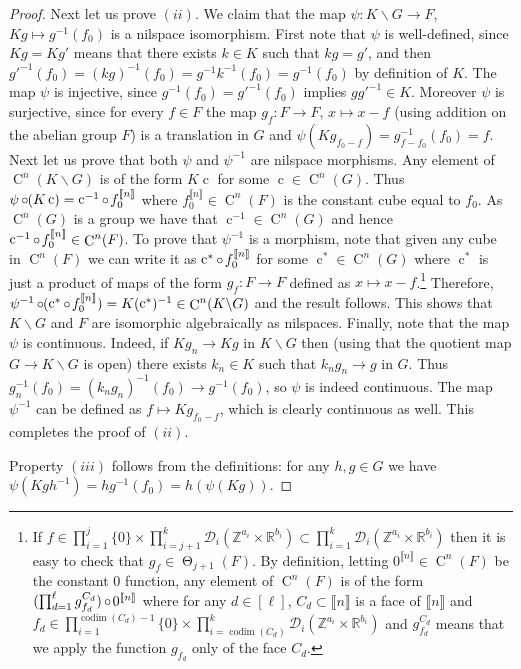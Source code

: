 \documentclass[a4paper,12pt,reqno]{amsart}
\theoremstyle{definition}
\def\to{\rightarrow}
\newcommand*{\db}[1]{\llbracket #1\rrbracket}
\newcommand{\mc}{\mathcal}
\newcommand{\mb}{\mathbb}
\DeclareMathOperator{\tran}{\Theta}
\DeclareMathOperator{\codim}{codim}
\DeclareMathOperator{\q}{c}
\DeclareMathOperator{\co}{\circ\hspace{-0.02 cm}}
\DeclareMathOperator{\cu}{C}
\begin{document}
\begin{proof}
Next let us prove $(ii)$.  We claim that the map $\psi:K\backslash G\to F$, $Kg \mapsto g^{-1}(f_0)$ is a nilspace isomorphism. First note that $\psi$ is well-defined, since $Kg=Kg'$ means that there exists $k\in K$ such that $kg=g'$, and then ${g'}^{-1}(f_0)=(kg)^{-1}(f_0)=g^{-1}k^{-1}(f_0)=g^{-1}(f_0)$ by definition of $K$. The map $\psi$ is injective, since $g^{-1}(f_0)={g'}^{-1}(f_0)$ implies $g{g'}^{-1}\in K$. Moreover $\psi$ is surjective, since for every $f\in F$ the map $g_f:F\to F$, $x\mapsto x-f$ (using addition on the abelian group $F$) is a translation in $G$ and $\psi(Kg_{f_0-f})=g^{-1}_{f-f_0}(f_0)=f$. Next let us prove that both $\psi$ and $\psi^{-1}$ are nilspace morphisms. Any element of $\cu^n(K\backslash G)$ is of the form $K\q$ for some $\q\in \cu^n(G)$. Thus $\psi\co (K\q) = \q^{-1} \co f_0^{\db{n}}$ where $f_0^{\db{n}}\in \cu^n(F)$ is the constant cube equal to $f_0$. As $\cu^n(G)$ is a group we have that $\q^{-1}\in \cu^n(G)$ and hence $\q^{-1}\co f_0^{\db{n}}\in\cu^n(F)$. To prove that $\psi^{-1}$ is a morphism, note that given any cube in $\cu^n(F)$ we can write it as $\q^*\co f_0^{\db{n}}$ for some $\q^*\in \cu^n(G)$ where $\q^*$ is just a product of maps of the form $g_f:F\to F$ defined as $x\mapsto x-f$.\footnote{ If $f\in \prod_{i=1}^j\{0\}\times \prod_{i=j+1}^k \mc{D}_i(\mb{Z}^{a_i}\times \mb{R}^{b_i})\subset \prod_{i=1}^k \mc{D}_i(\mb{Z}^{a_i}\times \mb{R}^{b_i})$ then it is easy to check that $g_f\in \tran_{j+1}(F)$. By definition, letting $0^{\db{n}}\in \cu^n(F)$ be the constant 0 function, any element of $\cu^n(F)$ is of the form $(\prod_{d=1}^\ell g_{f_d}^{C_d} )\co 0^{\db{n}}$ where for any $d\in[\ell]$, $C_d\subset \db{n}$ is a face of $\db{n}$ and $f_d\in \prod_{i=1}^{\codim(C_d)-1}\{0\}\times \prod_{i=\codim(C_d)}^k \mc{D}_i(\mb{Z}^{a_i}\times \mb{R}^{b_i})$ and $g_{f_d}^{C_d}$ means that we apply the function $g_{f_d}$ only of the face $C_d$.} Therefore, $\psi^{-1} \co (\q^*\co f_0^{\db{n}}) = K(\q^*)^{-1}\in \cu^n(K\backslash G)$ and the result follows. This shows that $K\backslash G$ and $F$ are isomorphic algebraically as nilspaces. Finally, note that the map $\psi$ is continuous. Indeed, if $Kg_n\to Kg$ in $K\backslash G$ then  (using that the quotient map $G\to K\backslash G$ is open) there exists $k_n\in K$ such that $k_ng_n\to g$ in $G$. Thus $g_n^{-1}(f_0) = (k_ng_n)^{-1}(f_0)\to g^{-1}(f_0)$, so $\psi$ is indeed continuous. The map $\psi^{-1}$ can be defined as $f\mapsto Kg_{f_0-f}$, which is clearly continuous as well. This completes the proof of $(ii)$.

Property $(iii)$ follows from the definitions: for any $h,g\in G$ we have $\psi(Kgh^{-1})=hg^{-1}(f_0) = h(\psi(Kg))$.
\end{proof}
\end{document}
